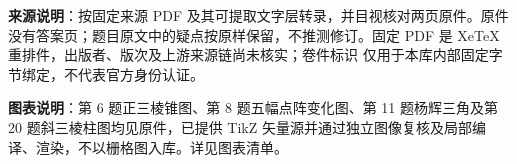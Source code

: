 


\begin{gktip}
\textbf{来源说明}：按固定来源 PDF 及其可提取文字层转录，并目视核对两页原件。原件没有答案页；题目原文中的疑点按原样保留，不推测修订。固定 PDF 是 XeTeX 重排件，出版者、版次及上游来源链尚未核实；卷件标识 仅用于本库内部固定字节绑定，不代表官方身份认证。

\textbf{图表说明}：第 6 题正三棱锥图、第 8 题五幅点阵变化图、第 11 题杨辉三角及第 20 题斜三棱柱图均见原件，已提供 TikZ 矢量源并通过独立图像复核及局部编译、渲染，不以栅格图入库。详见图表清单。
\end{gktip}


